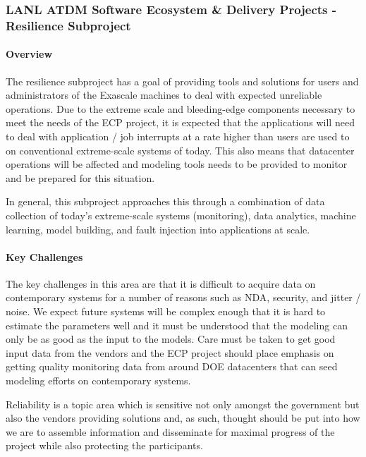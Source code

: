 \subsubsection{LANL ATDM Software Ecosystem \& Delivery Projects - Resilience Subproject} 

\paragraph{Overview}
The resilience subproject has a goal of providing tools and solutions for
users and administrators of the Exascale machines to deal with expected
unreliable operations.  Due to the extreme scale and bleeding-edge components
necessary to meet the needs of the ECP project, it is expected that the
applications will need to deal with application / job interrupts at a rate
higher than users are used to on conventional extreme-scale systems of today.
This also means that datacenter operations will be affected and modeling tools
needs to be provided to monitor and be prepared for this situation.

In general, this subproject approaches this through a combination of data
collection of today's extreme-scale systems (monitoring), data analytics,
machine learning, model building, and fault injection into applications at
scale.

\paragraph{Key Challenges}
The key challenges in this area are that it is difficult to acquire data on
contemporary systems for a number of reasons such as NDA, security, and 
jitter / noise.  We expect future systems will be complex enough that it is
hard to estimate the parameters well and it must be understood that the
modeling can only be as good as the input to the models.  Care must be taken to
get good input data from the vendors and the ECP project should place emphasis
on getting quality monitoring data from around DOE datacenters that can seed
modeling efforts on contemporary systems.

Reliability is a topic area which is sensitive not only amongst the government
but also the vendors providing solutions and, as such, thought should be put
into how we are to assemble information and disseminate for maximal progress of
the project while also protecting the participants.

